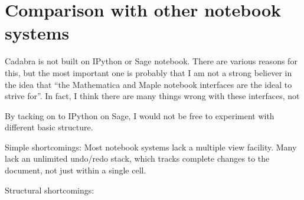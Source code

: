 \section{Comparison with other notebook systems}

Cadabra is not built on IPython or Sage notebook. There are various
reasons for this, but the most important one is probably that I am not
a strong believer in the idea that ``the Mathematica and Maple
notebook interfaces are the ideal to strive for''. In fact, I think
there are many things wrong with these interfaces, not

By tacking on to IPython on Sage, I would not be free to experiment
with different basic structure. 

Simple shortcomings: Most notebook systems lack a multiple view facility.
Many lack an unlimited undo/redo stack, which tracks complete changes
to the document, not just within a single cell.

Structural shortcomings: 
